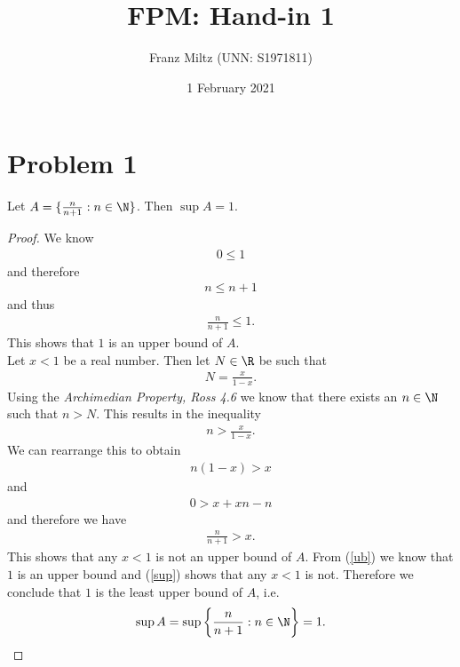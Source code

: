 \documentclass{article}
\begin{document}
\title{FPM: Hand-in 1}
\author{Franz Miltz (UNN: S1971811)}
\date{1 February 2021}
\maketitle

\section*{Problem 1}

\begin{claim*}
   Let $A=\{\frac{n}{n+1}:n\in\N\}$. Then $\sup A = 1$.
\end{claim*}
\begin{proof}
   We know
   \begin{align*}
      0 \leq 1
   \end{align*} 
   and therefore
   \begin{align*}
      n \leq n + 1
   \end{align*}
   and thus
   \begin{align}
      \label{ub}
      \frac{n}{n+1}\leq 1.
   \end{align}
   This shows that $1$ is an upper bound of $A$.\\
   Let $x<1$ be a real number. Then let $N\in\R$ be such that
   \begin{align*}
      N = \frac{x}{1-x}.
   \end{align*}
   Using the \emph{Archimedian Property, Ross 4.6} we know that there exists
   an $n\in\N$ such that $n > N$. This results in the inequality
   \begin{align*}
      n > \frac{x}{1-x}. 
   \end{align*}
   We can rearrange this to obtain 
   \begin{align*}
      n(1-x) > x
   \end{align*}
   and 
   \begin{align*}
      0 > x + xn - n
   \end{align*}
   and therefore we have
   \begin{align}
      \label{sup}
      \frac{n}{n+1} > x.
   \end{align}
   This shows that any $x<1$ is not an upper bound of $A$.
   From (\ref{ub}) we know that $1$ is an upper bound and (\ref{sup}) shows
   that any $x<1$ is not. Therefore we conclude that
   $1$ is the least upper bound of $A$, i.e.
   \begin{align*}
      \sup A = \sup\left\{\frac{n}{n+1}:n\in\N\right\} = 1.
   \end{align*}
\end{proof}
\end{document}
